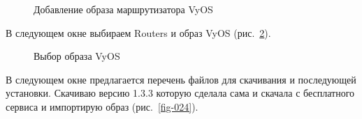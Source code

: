 \documentclass[
  english,
  russian,
  12pt,
  a4paper,
  DIV=11,
  numbers=noendperiod]{scrreprt}
\begin{document}
\begin{figure}


\caption{\label{fig-022}Добавление образа маршрутизатора VyOS}

\end{figure}%

В следующем окне выбираем Routers и образ VyOS (рис.~\ref{fig-023}).

\begin{figure}


\caption{\label{fig-023}Выбор образа VyOS}

\end{figure}%

В следующем окне предлагается перечень файлов для скачивания и
последующей установки. Скачиваю версию 1.3.3 которую сделала сама и
скачала с бесплатного сервиса и импортирую образ (рис.~\ref{fig-024}).
\end{document}
